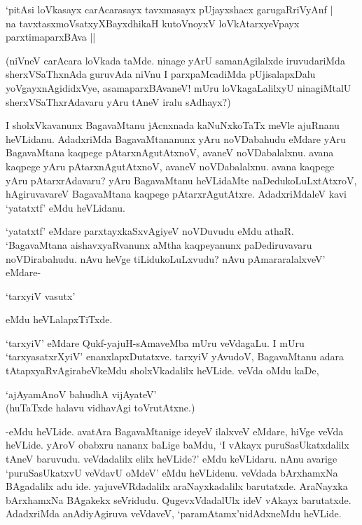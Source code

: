 \begin{shloka}
`pitA\s si loVkasayx carAcarasayx tavxmasayx pUjayxshacx garugaRriVyAnf |\\
na tavxtasxmoV\s satxyXBayxdhikaH kutoV\s noyxV loVkAtarxyeV\s payx parxtimaparxBAva ||
\end{shloka}

(niVneV carAcara loVkada taMde. ninage yArU samanAgilalxde iruvudariMda sherxVSaThxnAda guruvAda niVnu I parxpaMcadiMda pUjisalapxDalu yoVgayxnAgididxVye, asamaparxBAvaneV! mUru loVkagaLalilxyU ninagiMtalU sherxVSaThxrAdavaru yAru tAneV iralu sAdhayx?)

I sholxVkavanunx BagavaMtanu jAcnxnada kaNuNxkoTaTx meVle ajuRnanu heVLidanu. AdadxriMda BagavaMtananunx yAru noVDabahudu eMdare yAru BagavaMtana kaqpege pAtarxnAgutAtxnoV, avaneV noVDabalalxnu. avana kaqpege yAru pAtarxnAgutAtxnoV, avaneV noVDabalalxnu. avana kaqpege yAru pAtarxrAdavaru? yAru BagavaMtanu heVLidaMte naDedukoLuLxtAtxroV, hAgiruvavareV BagavaMtana kaqpege pAtarxrAgutAtxre. AdadxriMdaleV kavi `yatatxtf' eMdu heVLidanu.

`yatatxtf' eMdare parxtayxkaSxvAgiyeV noVDuvudu eMdu athaR. `BagavaMtana aishavxyaRvanunx aMtha kaqpeyanunx paDediruvavaru noVDirabahudu. nAvu heVge tiLidukoLuLxvudu? nAvu pAmararalalxveV' eMdare-

\begin{shloka}
`tarxyiV vasutx'
\end{shloka}

eMdu heVLalapxTiTxde.

`tarxyiV' eMdare Qukf-yajuH-sAmaveMba mUru veVdagaLu. I mUru `tarxyasatxrXyiV' enanxlapxDutatxve. tarxyiV yAvudoV, BagavaMtanu adara tAtapxyaRvAgirabeVkeMdu sholxVkadalilx heVLide. veVda oMdu kaDe,

\begin{shloka}
`ajAyamAnoV bahudhA vijAyateV'\\
(huTaTxde halavu vidhavAgi toVrutAtxne.)
\end{shloka}

-eMdu heVLide. avatAra BagavaMtanige ideyeV ilalxveV eMdare, hiVge veVda heVLide. yAroV obabxru nananx baLige baMdu, `I vAkayx puruSasUkatxdalilx tAneV baruvudu. veVdadalilx elilx heVLide?' eMdu keVLidaru. nAnu avarige `puruSasUkatxvU veVdavU oMdeV' eMdu heVLidenu. veVdada bArxhamxNa BAgadalilx adu ide. yajuveVRdadalilx araNayxkadalilx barutatxde. AraNayxka bArxhamxNa BAgakekx seVridudu. QugevxVdadalUlx ideV vAkayx barutatxde. AdadxriMda anAdiyAgiruva veVdaveV, `paramAtamx'nidAdxneMdu heVLide.

